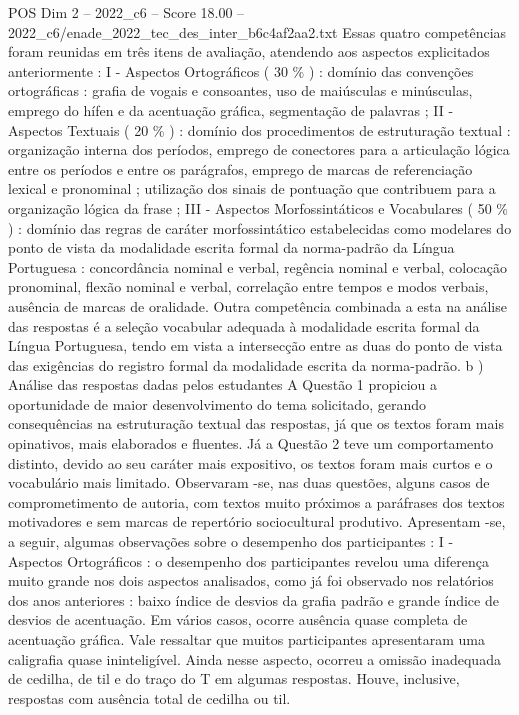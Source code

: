 \begin{textsample}{POS Dim 2 – 2022\_c6 – Score 18.00 – 2022\_c6/enade\_2022\_tec\_des\_inter\_b6c4af2aa2.txt}
Essas quatro competências foram reunidas em três itens de avaliação, atendendo aos aspectos explicitados anteriormente : I - Aspectos Ortográficos ( 30 \% ) : domínio das convenções ortográficas : grafia de vogais e consoantes, uso de maiúsculas e minúsculas, emprego do hífen e da acentuação gráfica, segmentação de palavras ; II - Aspectos Textuais ( 20 \% ) : domínio dos procedimentos de estruturação textual : organização interna dos períodos, emprego de conectores para a articulação lógica entre os períodos e entre os parágrafos, emprego de marcas de referenciação lexical e pronominal ; utilização dos sinais de pontuação que contribuem para a organização lógica da frase ; III - Aspectos Morfossintáticos e Vocabulares ( 50 \% ) : domínio das regras de caráter morfossintático estabelecidas como modelares do ponto de vista da modalidade escrita formal da norma-padrão da Língua Portuguesa : concordância nominal e verbal, regência nominal e verbal, colocação pronominal, flexão nominal e verbal, correlação entre tempos e modos verbais, ausência de marcas de oralidade.
Outra competência combinada a esta na análise das respostas é a seleção vocabular adequada à modalidade escrita formal da Língua Portuguesa, tendo em vista a intersecção entre as duas do ponto de vista das exigências do registro formal da modalidade escrita da norma-padrão. b ) Análise das respostas dadas pelos estudantes A Questão 1 propiciou a oportunidade de maior desenvolvimento do tema solicitado, gerando consequências na estruturação textual das respostas, já que os textos foram mais opinativos, mais elaborados e fluentes.
Já a Questão 2 teve um comportamento distinto, devido ao seu caráter mais expositivo, os textos foram mais curtos e o vocabulário mais limitado.
Observaram -se, nas duas questões, alguns casos de comprometimento de autoria, com textos muito próximos a paráfrases dos textos motivadores e sem marcas de repertório sociocultural produtivo.
Apresentam -se, a seguir, algumas observações sobre o desempenho dos participantes : I - Aspectos Ortográficos : o desempenho dos participantes revelou uma diferença muito grande nos dois aspectos analisados, como já foi observado nos relatórios dos anos anteriores : baixo índice de desvios da grafia padrão e grande índice de desvios de acentuação.
Em vários casos, ocorre ausência quase completa de acentuação gráfica.
Vale ressaltar que muitos participantes apresentaram uma caligrafia quase ininteligível.
Ainda nesse aspecto, ocorreu a omissão inadequada de cedilha, de til e do traço do T em algumas respostas.
Houve, inclusive, respostas com ausência total de cedilha ou til.

\end{textsample}
